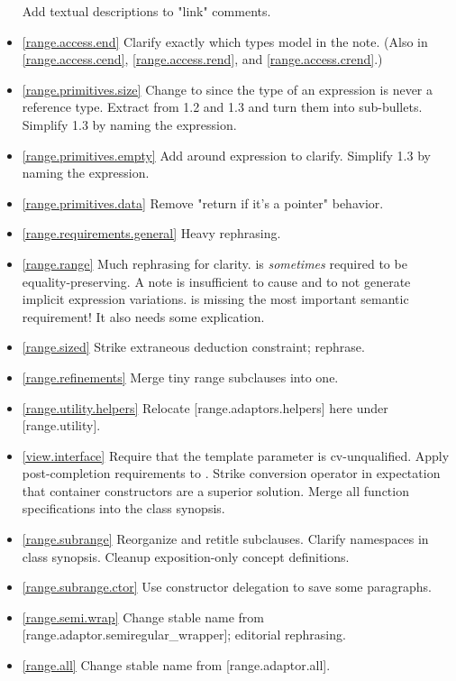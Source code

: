 \begin{itemize}
  Add textual descriptions to "link" comments.
\item \ref{range.access.end} Clarify exactly which types model 
  in the note. (Also in \ref{range.access.cend}, \ref{range.access.rend},
  and \ref{range.access.crend}.)
\item \ref{range.primitives.size} Change  to
   since the type of an expression is never a reference type.
  Extract  from 1.2 and 1.3 and turn them into
  sub-bullets. Simplify 1.3 by naming the expression.
\item \ref{range.primitives.empty} Add \tcode{()} around expression to clarify.
   Simplify 1.3 by naming the expression.
\item \ref{range.primitives.data}
  Remove "return  if it's a pointer" behavior.
\item \ref{range.requirements.general} Heavy rephrasing.
\item \ref{range.range} Much rephrasing for clarity.
   is \textit{sometimes} required to be equality-preserving.
  A note is insufficient to cause  and 
  to not generate implicit expression variations.
   is missing the most important
  semantic requirement! It also needs some explication.
\item \ref{range.sized} Strike extraneous deduction constraint; rephrase.
\item \ref{range.refinements} Merge tiny range subclauses into one.
\item \ref{range.utility.helpers} Relocate [range.adaptors.helpers] here
  under [range.utility].
\item \ref{view.interface} Require that the template parameter 
  is cv-unqualified. Apply post-completion requirements to .
  Strike conversion operator in expectation that container constructors are a
  superior solution.
  Merge all function specifications into the class synopsis.
\item \ref{range.subrange} Reorganize and retitle subclauses.
  Clarify namespaces in class synopsis.
  Cleanup exposition-only concept definitions.
\item \ref{range.subrange.ctor} Use constructor delegation to save some
  paragraphs.
\item \ref{range.semi.wrap} Change stable name from
  [range.adaptor.semiregular_wrapper]; editorial rephrasing.
\item \ref{range.all} Change stable name from [range.adaptor.all].

\end{itemize}
